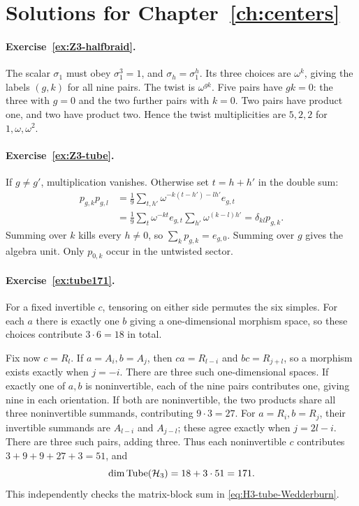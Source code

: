 \section{Solutions for Chapter~\ref{ch:centers}}

\paragraph{Exercise~\ref{ex:Z3-halfbraid}.}
\label{sol:ex:Z3-halfbraid}
The scalar $\sigma_1$ must obey $\sigma_1^3=1$, and
$\sigma_h=\sigma_1^h$.  Its three choices are $\omega^k$,
giving the labels $(g,k)$ for all nine pairs.  The twist is
$\omega^{gk}$.  Five pairs have $gk=0$: the three with $g=0$
and the two further pairs with $k=0$.  Two pairs have product one,
and two have product two.  Hence the twist multiplicities are
$5,2,2$ for $1,\omega,\omega^2$.



\paragraph{Exercise~\ref{ex:Z3-tube}.}
\label{sol:ex:Z3-tube}
If $g\ne g'$, multiplication vanishes.  Otherwise set $t=h+h'$
in the double sum:
\begin{align*}
 p_{g,k}p_{g,l}
 &=\frac19\sum_{t,h'}\omega^{-k(t-h')-lh'}e_{g,t}\\
 &=\frac19\sum_t\omega^{-kt}e_{g,t}
             \sum_{h'}\omega^{(k-l)h'}
 =\delta_{kl}p_{g,k}.
\end{align*}
Summing over $k$ kills every $h\ne0$, so
$\sum_kp_{g,k}=e_{g,0}$.  Summing over $g$ gives the algebra
unit.  Only $p_{0,k}$ occur in the untwisted sector.



\paragraph{Exercise~\ref{ex:tube171}.}
\label{sol:ex:tube171}
For a fixed invertible $c$, tensoring on either side permutes the
six simples.  For each $a$ there is exactly one $b$ giving a
one-dimensional morphism space, so these choices contribute
$3\cdot6=18$ in total.

Fix now $c=R_l$. If $a=A_i,b=A_j$, then
$ca=R_{l-i}$ and $bc=R_{j+l}$, so a morphism exists exactly
when $j=-i$. There are three such one-dimensional spaces.
If exactly one of $a,b$ is
noninvertible, each of the nine pairs contributes one, giving
nine in each orientation.  If both are noninvertible, the two
products share all three noninvertible summands, contributing
$9\cdot3=27$. For $a=R_i,b=R_j$, their invertible summands
are $A_{l-i}$ and $A_{j-l}$; these agree exactly when $j=2l-i$.
There are three such pairs, adding three. Thus each noninvertible $c$
contributes $3+9+9+27+3=51$, and
\[
 \dim\operatorname{Tube}(\mathcal H_3)=18+3\cdot51=171.
\]
This independently checks the matrix-block sum in
\eqref{eq:H3-tube-Wedderburn}.



